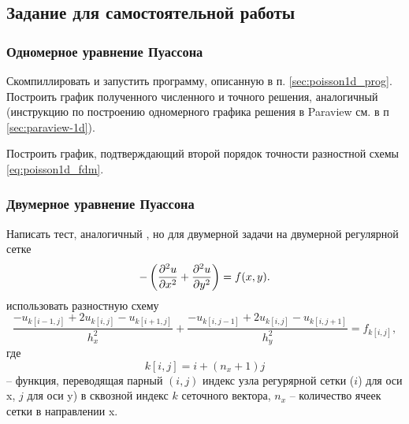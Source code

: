 \clearpage
\subsection{Задание для самостоятельной работы}

\subsubsection{Одномерное уравнение Пуассона}

Скомпиллировать и запустить программу, описанную в п. \ref{sec:poisson1d_prog}.
Построить график полученного численного и точного решения, аналогичный 
(инструкцию по построению одномерного графика решения в Paraview см. в п \ref{sec:paraview-1d}).

Построить график, подтверждающий второй порядок точности
разностной схемы \eqref{eq:poisson1d_fdm}.

\subsubsection{Двумерное уравнение Пуассона}

Написать тест, аналогичный \cvar{[poisson1]}, но
для двумерной задачи на двумерной регулярной сетке
\begin{equation*}
   -\left(\frac{\partial^2 u}{\partial x^2} + \frac{\partial^2 u}{\partial y^2}\right) = f(x, y).
\end{equation*}
использовать разностную схему
\begin{equation*}
   \frac{-u_{k[i-1,j]} + 2 u_{k[i, j]} - u_{k[i+1,j]}}{h_x^2} +
   \frac{-u_{k[i,j-1]} + 2 u_{k[i, j]} - u_{k[i,j+1]}}{h_y^2} =
   f_{k[i,j]},
\end{equation*}
где
\begin{equation}
    \label{eq:tasks_ij2k}
    k[i, j] = i + (n_x+1) j
\end{equation}
-- функция, переводящая парный $(i,j)$ индекс узла регурярной сетки ($i$) для оси x, $j$ для оси y) в сквозной индекс $k$
сеточного вектора, $n_x$ -- количество ячеек сетки в направлении x.

